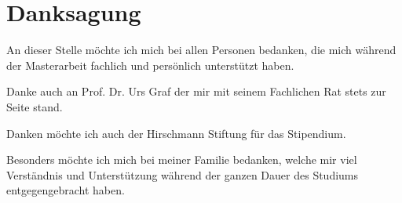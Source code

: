 \chapter{Danksagung}




An dieser Stelle möchte ich mich bei allen Personen bedanken, die mich während der Masterarbeit fachlich und persönlich unterstützt haben.

Danke auch an Prof. Dr. Urs Graf der mir mit seinem Fachlichen Rat stets zur Seite stand.

Danken möchte ich auch der Hirschmann Stiftung für das Stipendium.


Besonders möchte ich mich bei meiner Familie bedanken, welche mir viel Verständnis und Unterstützung während der ganzen Dauer des Studiums entgegengebracht haben.